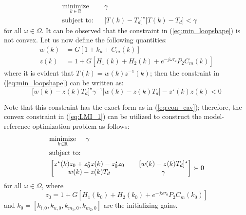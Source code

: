 \documentclass[a4paper, 10pt, conference]{ieeeconf}
\begin{document}
 \begin{equation} \label{eq:min_loopshape}
\begin{aligned}
& \underset{ k \in \mathbb{R}}{\text{minimize}}
& & \gamma  \\
& \text{subject to:} & & \bigl[T(k)-T_d\bigr]^{\star}\bigl[T(k)-T_d\bigr] < \gamma
\end{aligned}
\end{equation}
for all $\omega \in \Omega$. It can be observed that the constraint in (\ref{eq:min_loopshape}) is not convex. Let us now define the following quantities:
\begin{equation} 
\begin{aligned}
w(k) &= G[1+k_u+C_m(k)] \\
z(k) &= 1+G[H_1(k)+H_2(k)+e^{-j\omega \tau_{a}}P_2C_m(k)]
\end{aligned}
\end{equation}
where it is evident that $T(k) = w(k)z^{-1}(k)$; then the constraint in (\ref{eq:min_loopshape}) can be written as:
$$
\bigl[w(k)-z(k)T_d \bigr]^{\star}\gamma^{-1} \bigl[w(k)-z(k)T_d \bigr] - z^{\star}(k)z(k)<0
$$

Note that this constraint has the exact form as in (\ref{eq:con_cav}); therefore, the convex constraint in (\ref{eq:LMI_1}) can be utilized to construct the model-reference optimization problem as follows:
\begin{equation} \label{eq:loop_shape_LMI_inf}
\begin{aligned}
& \underset{ k \in \mathbb{R}}{\text{minimize}} \hspace{0.5cm} \gamma  \\
& \text{subject to:} \\
&
\begin{bmatrix}
z^{\star}(k)z_0 + z_0^{\star}z(k) - z_0^{\star}z_0 & \phantom{xx}[w(k)-z(k)T_d]^{\star} \\ 
w(k)-z(k)T_d & \phantom{xx}\gamma
\end{bmatrix} \succ 0
\end{aligned}
\end{equation}
for all $\omega \in \Omega$, where $$z_0 = 1+G[H_1(k_0) + H_2(k_0)+e^{-j\omega \tau_{a}}P_2C_m(k_0)]$$ and $k_0 =[k_{i,0},k_{u,0},k_{m_1,0},k_{m_2,0}  ]$ are the initializing gains. 
\end{document}
